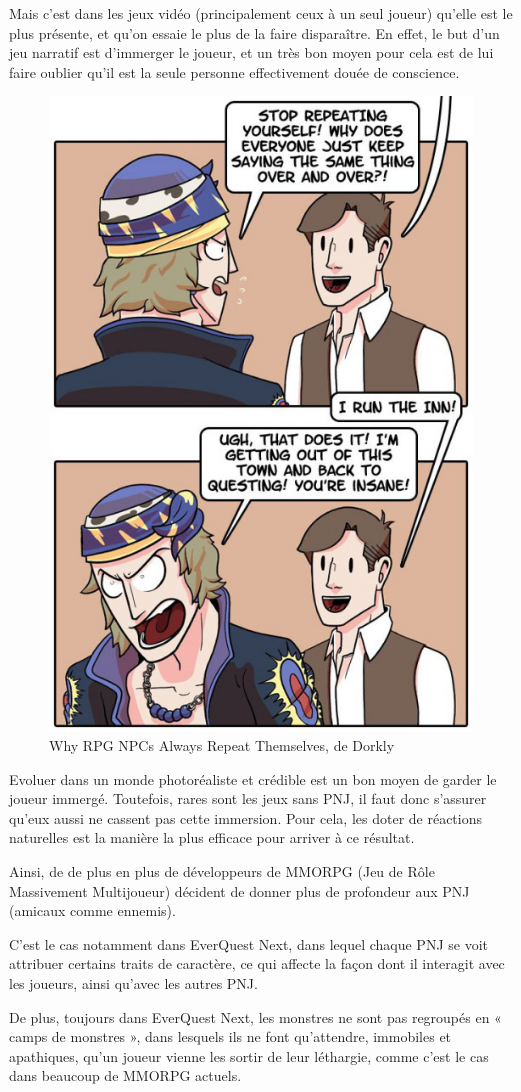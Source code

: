 \documentclass[a4paper, 12pt]{article} %
\begin{document}
Mais c'est dans les jeux vidéo (principalement ceux à un seul joueur) qu'elle est le plus présente, et qu’on essaie le plus de la faire disparaître. En effet, le but d’un jeu narratif est d’immerger le joueur, et un très bon moyen pour cela est de lui faire oublier qu’il est la seule personne effectivement douée de conscience.

\begin{figure}[!h]%
	\begin{center} 
		\includegraphics[width=0.40\columnwidth]{images/repeat3.jpg}%
		\caption{Why RPG NPCs Always Repeat Themselves, de Dorkly}%
	\end{center}
\end{figure}

Evoluer dans un monde photoréaliste et crédible est un bon moyen de garder le joueur immergé. Toutefois, rares sont les jeux sans PNJ, il faut donc s’assurer qu’eux aussi ne cassent pas cette immersion. Pour cela, les doter de réactions naturelles est la manière la plus efficace pour arriver à ce résultat.

Ainsi, de de plus en plus de développeurs de MMORPG (Jeu de Rôle Massivement Multijoueur) décident de donner plus de profondeur aux PNJ (amicaux comme ennemis).

\newpage
C’est le cas notamment dans EverQuest Next, dans lequel chaque PNJ se voit attribuer certains traits de caractère, ce qui affecte la façon dont il interagit avec les joueurs, ainsi qu’avec les autres PNJ. 

De plus, toujours dans EverQuest Next, les monstres ne sont pas regroupés en « camps de monstres », dans lesquels ils ne font qu’attendre, immobiles et apathiques, qu’un joueur vienne les sortir de leur léthargie, comme c’est le cas dans beaucoup de MMORPG actuels. 
\end{document}
